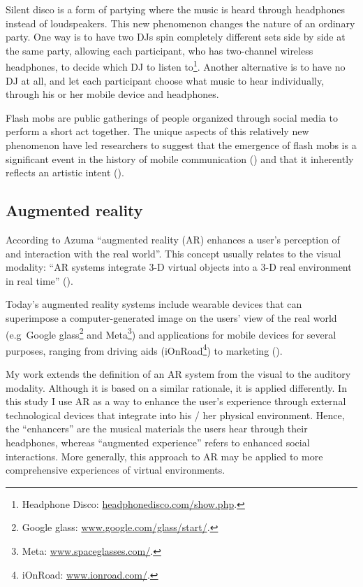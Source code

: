 \documentclass[a4paper,11pt]{article}
\begin{document}
Silent disco is a form of partying where the music is heard through headphones instead of loudspeakers.
This new phenomenon changes the nature of an ordinary party.
One way is to have two DJs spin completely different sets side by side at the same party, allowing each participant, who has two-channel wireless headphones, to decide which DJ to listen to\footnote{Headphone Disco: \href{http://headphonedisco.com/show.php}{headphonedisco.com/show.php}.}.
Another alternative is to have no DJ at all, and let each participant choose what music to hear individually, through his or her mobile device and headphones.

Flash mobs are public gatherings of people organized through social media to perform a short act together.
The unique aspects of this relatively new phenomenon have led researchers to suggest that the emergence of flash mobs is a significant event in the history of mobile communication (\cite{nicholson05}) and that it inherently reflects an artistic intent (\cite{brejzek10}).

\subsection{Augmented reality} \label{literature:ar}

According to Azuma ``augmented reality (AR) enhances a user's perception of and interaction with the real world''.
This concept usually relates to the visual modality: ``AR systems integrate 3-D virtual objects into a 3-D real environment in real time'' (\cite{azuma97}).

Today's augmented reality systems include wearable devices that can superimpose a computer-generated image on the users' view of the real world (e.g\ Google glass\footnote{Google glass: \href{http://www.google.com/glass/start/}{www.google.com/glass/start/}.} and Meta\footnote{Meta: \href{https://www.spaceglasses.com/}{www.spaceglasses.com/}.}) and applications for mobile devices for several purposes, ranging from driving aids (iOnRoad\footnote{iOnRoad: \href{http://www.ionroad.com/}{www.ionroad.com/}.}) to marketing (\cite{ikea}).

My work extends the definition of an AR system from the visual to the auditory modality.
Although it is based on a similar rationale, it is applied differently.
In this study I use AR as a way to enhance the user's experience through external technological devices that integrate into his / her physical environment.
Hence, the ``enhancers'' are the musical materials the users hear through their headphones, whereas ``augmented experience'' refers to enhanced social interactions.
More generally, this approach to AR may be applied to more comprehensive experiences of virtual environments.
\end{document}
